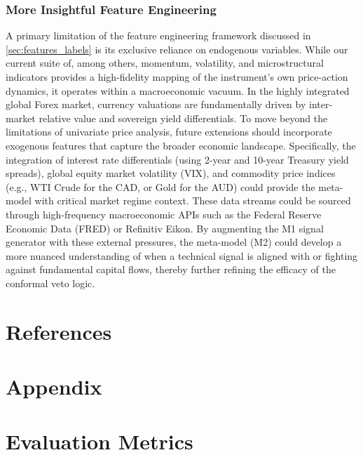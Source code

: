 \documentclass[12pt, a4paper]{article}
\begin{document}
\subsubsection{More Insightful Feature Engineering}

A primary limitation of the feature engineering framework discussed in \ref{sec:features_labels} is its exclusive reliance on endogenous variables. 
While our current suite of, among others, momentum, volatility, and microstructural indicators provides a high-fidelity mapping of the instrument's own price-action
dynamics, it operates within a macroeconomic vacuum. In the highly integrated global Forex market, currency valuations are fundamentally driven by inter-market relative value and 
sovereign yield differentials. To move beyond the limitations of univariate price analysis, future extensions should incorporate exogenous features that capture the broader economic landscape. 
Specifically, the integration of interest rate differentials (using 2-year and 10-year Treasury yield spreads), global equity market volatility (VIX), and commodity price indices 
(e.g., WTI Crude for the CAD, or Gold for the AUD) could provide the meta-model with critical market regime context. These data streams could be sourced through high-frequency 
macroeconomic APIs such as the Federal Reserve Economic Data (FRED) or Refinitiv Eikon. By augmenting the M1 signal generator with these external pressures, the meta-model (M2)
could develop a more nuanced understanding of when a technical signal is aligned with or fighting against fundamental capital flows, thereby further refining the efficacy of the 
conformal veto logic.



\pagebreak

\section{References}
\printbibliography[heading=none]

\section{Appendix}
\appendix


\section{Evaluation Metrics}\label{app:metrics}
\end{document}
